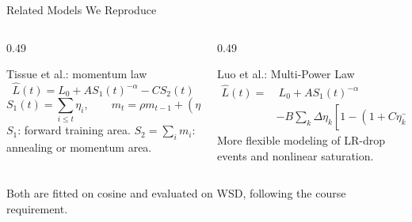 \documentclass[fontset=fandol,aspectratio=169,10pt]{ctexbeamer}
\newcommand{\smallnote}[1]{{\scriptsize\color{tdltGray}#1}}
\begin{document}
\begin{frame}{Related Models We Reproduce}
  \begin{columns}[T,onlytextwidth]
    \begin{column}{0.49\textwidth}
      \begin{block}{Tissue et al.: momentum law}
        \[
          \widehat L(t)
          =
          L_0 + A S_1(t)^{-\alpha} - C S_2(t)
        \]
        \[
          S_1(t)=\sum_{i\le t}\eta_i,
          \qquad
          m_t=\rho m_{t-1}+(\eta_{t-1}-\eta_t)_+.
        \]
        \small \(S_1\): forward training area. \(S_2=\sum_i m_i\): annealing or momentum area.
      \end{block}
    \end{column}
    \begin{column}{0.49\textwidth}
      \begin{block}{Luo et al.: Multi-Power Law}
        \[
        \begin{aligned}
        \widehat L(t)
        =&\ L_0+A S_1(t)^{-\alpha}\\
        &-B\sum_k \Delta\eta_k
        \left[1-\left(1+C\eta_k^{-\gamma}S_k(t)\right)^{-\beta}\right].
        \end{aligned}
        \]
        \small More flexible modeling of LR-drop events and nonlinear saturation.
      \end{block}
    \end{column}
  \end{columns}
  \vspace{0.3em}
  \smallnote{Both are fitted on cosine and evaluated on WSD, following the course requirement.}
\end{frame}
\end{document}
